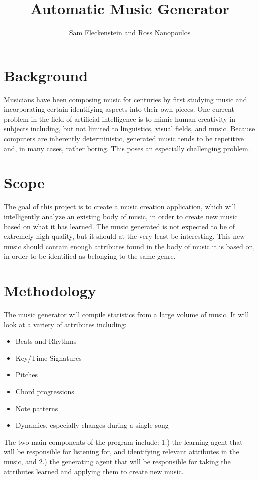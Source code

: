 \documentclass{article}
\begin{document}
\title{Automatic Music Generator}
\author{Sam Fleckenstein and Ross Nanopoulos}
\maketitle

\section{Background}
Musicians have been composing music for centuries by first studying music and incorporating certain identifying aspects into their own pieces. One current problem in the field of artificial intelligence is to mimic human creativity in subjects including, but not limited to linguistics, visual fields, and music.  Because computers are inherently deterministic, generated music tends to be repetitive and, in many cases, rather boring.  This poses an especially challenging problem.

\section{Scope}
The goal of this project is to create a music creation application, which will intelligently  analyze an existing body of music, in order to create new music based on what it has learned. The music generated is not expected to be of extremely high quality, but it should at the very least be interesting. This new music should contain enough attributes found in the body of music it is based on, in order to be identified as belonging to the same genre.

\section{Methodology}
The music generator will compile statistics from a large volume of music.  It will look at a variety of attributes including:
\begin{itemize}
\item Beats and Rhythms
\item Key/Time Signatures
\item Pitches
\item Chord progressions
\item Note patterns
\item Dynamics, especially changes during a single song
\end{itemize}

The two main components of the program include: 1.) the learning agent that will be responsible for listening for, and identifying relevant attributes in the music, and 2.) the generating agent that will be responsible for taking the attributes learned and applying them to create new music.
\end{document}
